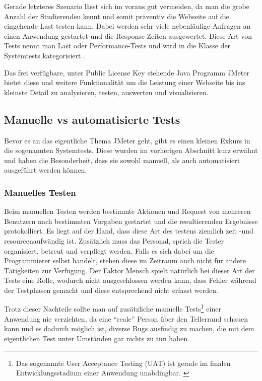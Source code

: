 \documentclass[a4paper,12pt]{article}
\begin{document}
Gerade letzteres Szenario lässt sich im voraus gut vermeiden, da man die grobe Anzahl der Studierenden kennt und somit präventiv die Webseite auf die eingehende Last testen kann. Dabei werden sehr viele nebenläufige Anfragen an einen Anwendung gestartet und die Response Zeiten ausgewertet. Diese Art von Tests nennt man Last oder Performance-Tests und wird in die Klasse der Systemtests kategorisiert \cite{online:LastUndPerformanceTest}. 

Das frei verfügbare, unter Public License Key stehende Java Programm JMeter bietet diese und weitere Funktionalität um die Leistung einer Webseite bis ins kleinste Detail zu analysieren, testen, auswerten und visualisieren.

\subsection{Manuelle vs automatisierte Tests}
Bevor es an das eigentliche Thema JMeter geht, gibt es einen kleinen Exkurs in die sogenannten Systemtests. Diese wurden im vorherigen Abschnitt kurz erwähnt und haben die Besonderheit, dass sie sowohl manuell, als auch automatisiert ausgeführt werden können. 

\subsubsection{Manuelles Testen}
Beim manuellen Testen werden bestimmte Aktionen und Request von mehreren Benutzern nach bestimmten Vorgaben gestartet und die resultierenden Ergebnisse protokolliert. Es liegt auf der Hand, dass diese Art des testens ziemlich zeit -und resourcenaufwändig ist. Zusätzlich muss das Personal, sprich die Tester organisiert, betreut und verpflegt werden. Falls es sich dabei um die Programmierer selbst handelt, stehen diese im Zeitraum auch nicht für andere Tätigkeiten zur Verfügung. Der Faktor Mensch spielt natürlich bei dieser Art der Tests eine Rolle, wodurch nicht ausgeschlossen werden kann, dass Fehler während der Testphasen gemacht und diese entsprechend nicht erfasst werden. \cite[S. 11]{book:ApacheJMeter}

Trotz dieser Nachteile sollte man auf zusätzliche manuelle Tests\footnote{Das sogenannte User Acceptance Testing (UAT) ist gerade im finalen Entwicklungsstadium einer Anwendung unabdingbar. \cite{online:wikiUAT}} einer Anwendung nie verzichten, da eine "`reale"' Person über den Tellerrand schauen kann und es dadurch möglich ist, diverse Bugs ausfindig zu machen, die mit dem eigentlichen Test unter Umständen gar nichts zu tun haben.
\end{document}
